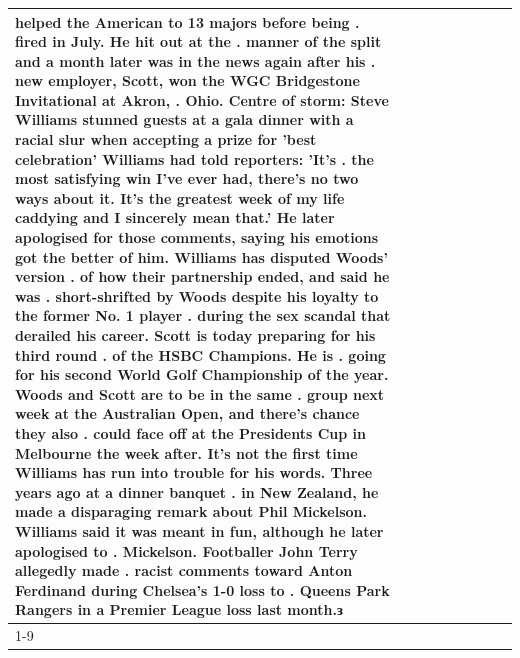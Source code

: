 \begin{table}[H]
\begin{tabular}{lllrlllll}
helped the American to 13 majors before being . fired in July. He hit out at the . manner of the split and a month later was in the news again after his . new employer, Scott, won the WGC Bridgestone Invitational at Akron, . Ohio. Centre of storm: Steve Williams stunned guests at a gala dinner with a racial slur when accepting a prize for 'best celebration' Williams had told reporters: 'It's . the most satisfying win I've ever had, there's no two ways about it. It's the greatest week of my life caddying and I sincerely mean that.' He later apologised for those comments, saying his emotions got the better of him. Williams has disputed Woods' version . of how their partnership ended, and said he was . short-shrifted by Woods despite his loyalty to the former No. 1 player . during the sex scandal that derailed his career. Scott is today preparing for his third round . of the HSBC Champions. He is . going for his second World Golf Championship of the year. Woods and Scott are to be in the same . group next week at the Australian Open, and there's chance they also . could face off at the Presidents Cup in Melbourne the week after. It's not the first time Williams has run into trouble for his words. Three years ago at a dinner banquet . in New Zealand, he made a disparaging remark about Phil Mickelson. Williams said it was meant in fun, although he later apologised to . Mickelson. Footballer John Terry allegedly made . racist comments toward Anton Ferdinand during Chelsea's 1-0 loss to . Queens Park Rangers in a Premier League loss last month.ɜ \\
\cline{1-9}

\end{tabular}
\end{table}
